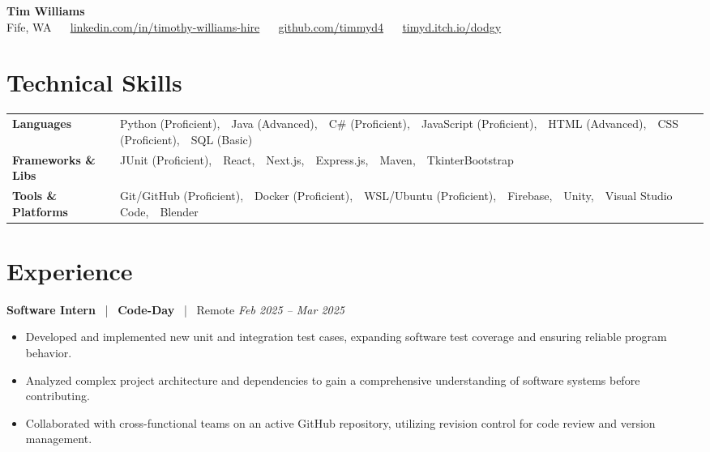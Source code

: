 \documentclass[10pt, letterpaper]{article}
\newcommand{\jobhead}[4]{%
  \vspace{3pt}%
  {\bfseries\color{dark}#1}%
  ~{\color{light}|}~%
  {\bfseries\color{navy}#2}%
  ~{\color{light}|}~%
  {\color{light}#3}%
  \hfill{\color{light}\small\textit{#4}}\\[-2pt]%
}
\newcommand{\skillrow}[2]{%
  {\bfseries #1} & #2 \\[2pt]%
}
\begin{document}

\begin{center}
  {\huge\bfseries\color{navy} Tim Williams}\\[2pt]
  {\small\color{light}
    Fife, WA
    ~\textbullet~
    \href{https://linkedin.com/in/timothy-williams-hire}{linkedin.com/in/timothy-williams-hire}
    ~\textbullet~
    \href{https://github.com/timmyd4}{github.com/timmyd4}
    ~\textbullet~
    \href{https://timyd.itch.io/dodgy}{timyd.itch.io/dodgy}
  }
\end{center}

\section{Technical Skills}

\begin{tabular}{@{}p{1.6in} p{5.2in}@{}}
  \skillrow{Languages}{Python (Proficient),\ \ Java (Advanced),\ \ C\# (Proficient),\ \ JavaScript (Proficient),\ \ HTML (Advanced),\ \ CSS (Proficient),\ \ SQL (Basic)}
  \skillrow{Frameworks \& Libs}{JUnit (Proficient),\ \ React,\ \ Next.js,\ \ Express.js,\ \ Maven,\ \ TkinterBootstrap}
  \skillrow{Tools \& Platforms}{Git/GitHub (Proficient),\ \ Docker (Proficient),\ \ WSL/Ubuntu (Proficient),\ \ Firebase,\ \ Unity,\ \ Visual Studio Code,\ \ Blender}
\end{tabular}

\section{Experience}

\jobhead{Software Intern}{Code-Day}{Remote}{Feb 2025 – Mar 2025}
\begin{itemize}
  \item Developed and implemented new unit and integration test cases, expanding software test coverage and ensuring reliable program behavior.
  \item Analyzed complex project architecture and dependencies to gain a comprehensive understanding of software systems before contributing.
  \item Collaborated with cross-functional teams on an active GitHub repository, utilizing revision control for code review and version management.
\end{itemize}
\end{document}
